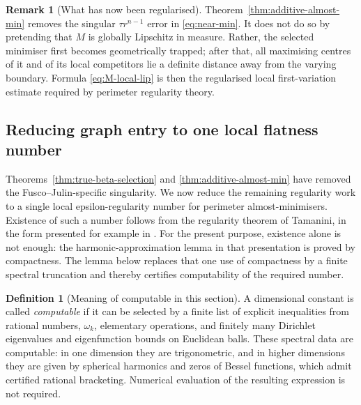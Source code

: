 \documentclass[11pt]{amsart}
\theoremstyle{definition}
\newtheorem{definition}[theorem]{Definition}
\newtheorem{remark}[theorem]{Remark}
\begin{document}
\begin{remark}[What has now been regularised]\label{rem:regularised-centre}
Theorem~\ref{thm:additive-almost-min} removes the singular
\(\tau r^{n-1}\) error in \eqref{eq:near-min}.  It does not do so by
pretending that \(M\) is globally Lipschitz in measure.  Rather, the
selected minimiser first becomes geometrically trapped; after that, all
maximising centres of it and of its local competitors lie a definite
distance away from the varying boundary.  Formula
\eqref{eq:M-local-lip} is then the regularised local first-variation
estimate required by perimeter regularity theory.
\end{remark}

\subsection{Reducing graph entry to one local flatness number}

Theorems~\ref{thm:true-beta-selection} and
\ref{thm:additive-almost-min} have removed the Fusco--Julin-specific
singularity.  We now reduce the remaining regularity work to a single local
epsilon-regularity number for perimeter almost-minimisers.  Existence of such
a number follows from the regularity theorem of Tamanini, in the form
presented for example in \cite[Chapters 24--26]{Maggi}.  For the present
purpose, existence alone is not enough: the harmonic-approximation lemma in
that presentation is proved by compactness.  The lemma below replaces that
one use of compactness by a finite spectral truncation and thereby certifies
computability of the required number.

\begin{definition}[Meaning of computable in this section]\label{def:computable}
A dimensional constant is called \emph{computable} if it can be selected by
a finite list of explicit inequalities from rational numbers, \(\omega_k\),
elementary operations, and finitely many Dirichlet eigenvalues and
eigenfunction bounds on Euclidean balls.  These spectral data are
computable: in one dimension they are trigonometric, and in higher
dimensions they are given by spherical harmonics and zeros of Bessel
functions, which admit certified rational bracketing.  Numerical evaluation
of the resulting expression is not required.
\end{definition}
\end{document}
